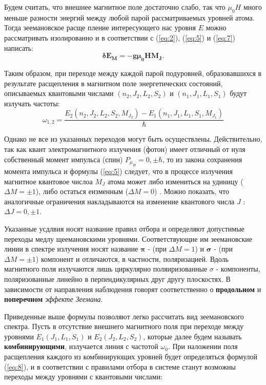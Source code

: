 Будем считать, что внешнее магнитное поле достаточно слабо, так что $\mu_0 H$ много меньше разности энергий между любой парой  рассматриваемых уровней атома. Тогда зеемановское расще пление интересующего нас уровня $E$ можно рассматривать изолированно и в соответствии с (\ref{eq:2}), (\ref{eq:5}) и (\ref{eq:7}) написать: 
\begin{equation}
\mathbf{\delta E_{M} = - g \mu_{0} H M_J}.
\label{eq:8} 
\end{equation}  

Таким образом, при переходе между каждой парой подуровней, образовавшихся в результате расщепления в магнитном поле энергетических состояний, описываемых квантовыми числами $(n_{2},J_{2},L_{2},S_{2})$ и $(n_{1},J_{1},L_{1},S_{1})$  будут излучать частоты: 
\begin{equation}
\omega_{1,2} = \frac{E_{2}(n_{2},J_{2},L_{2},S_{2},M_{J_{2}})-E_{1}(n_{1},J_{1},L_{1},S_{1},M_{J_1})}{\hbar}
\label{eq:9} 
\end{equation}


Однако не все из указанных переходов могут быть осуществлены. Действительно, так как квант электромагнитного излучения (фотон) имеет отличный от нуля собственный момент импульса (спин) $P_{\mu_H} = {0,\pm\hbar}$, то из закона сохранения момента импульса и формулы (\ref{eq:5}) следует, что в процессе излучения магнитное квантовое числоа $M_J$ атома  может либо измениться на удиницу ($\Delta M=\pm 1$),  либо остаться еизменным ($\Delta M = 0$) . Можно показать, что аналогичные ограничения накладываются на изменение квантового числа $J$ : $\Delta J = {0,\pm 1}$.

Указанные усдлвия носят название правил отбора и определяют допустимые переходы медлу щеемановскими уровнями. Соответствующие им зеемановские линии в спектре излучения носят название $\mathbf{\pi}$ - (при $\Delta M = 1$) и $\mathbf{\sigma }$ - (при $\Delta M= \pm 1$)  компонент и отличаются, в частности, поляризацией. Вдоль магнитного поля излучаются лишь циркулярно поляиризованные $\sigma$ - компоненты,  поляризованные линейно в перпендикулярных друг другу плоскостях. В зависимости от направления наблюдения говорят соответственно о \textbf{продольном} и \textbf{поперечном} \textit{эффекте Зеемана}. 

Приведенные выше формулы позволяют легко рассчитать вид зеемановского спектра. Пусть в отсутствие внешнего магнитного поля при переходе между уровнями $E_{1}(J_{1},L_{1},S_{1})$ и $E_{2}(J_{2},L_{2},S_{2})$, которые далее будем называть \textbf{комбинирующими}, излучается линия с частотой $\omega_0$. При наложении поля расщепления каждого из комбинирующих уровней будет определяться формулой (\ref{eq:8}), и в соответствии с правилами отбора в системе станут возможны переходы между уровнями с квантовыми числами: 

